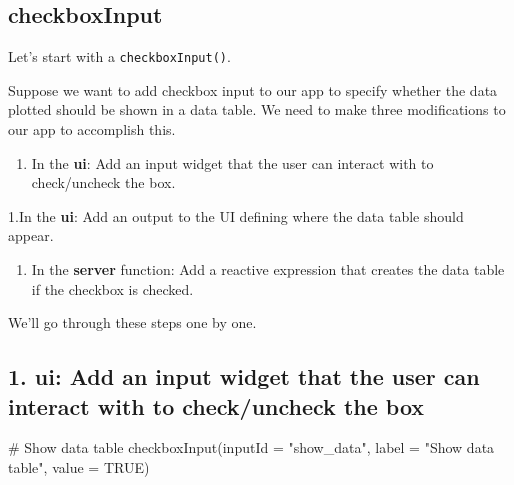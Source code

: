 \documentclass[
  letterpaper,
  DIV=11,
  numbers=noendperiod]{scrreprt}
\newenvironment{Shaded}{\begin{snugshade}}{\end{snugshade}}
\newcommand{\AttributeTok}[1]{\textcolor[rgb]{0.40,0.46,0.14}{#1}}
\newcommand{\CommentTok}[1]{\textcolor[rgb]{0.37,0.37,0.37}{#1}}
\newcommand{\ConstantTok}[1]{\textcolor[rgb]{0.56,0.35,0.01}{#1}}
\newcommand{\FunctionTok}[1]{\textcolor[rgb]{0.28,0.35,0.67}{#1}}
\newcommand{\NormalTok}[1]{\textcolor[rgb]{0.00,0.46,0.62}{#1}}
\newcommand{\StringTok}[1]{\textcolor[rgb]{0.13,0.47,0.30}{#1}}
\providecommand{\tightlist}{%
  \setlength{\itemsep}{0pt}\setlength{\parskip}{0pt}}
\begin{document}
\hypertarget{checkboxinput}{%
\subsection{checkboxInput}\label{checkboxinput}}

Let's start with a \texttt{checkboxInput()}.

Suppose we want to add checkbox input to our app to specify whether the
data plotted should be shown in a data table. We need to make three
modifications to our app to accomplish this.

\begin{enumerate}
\def\labelenumi{\arabic{enumi}.}
\tightlist
\item
  In the \textbf{ui}: Add an input widget that the user can interact
  with to check/uncheck the box.
\end{enumerate}

1.In the \textbf{ui}: Add an output to the UI defining where the data
table should appear.

\begin{enumerate}
\def\labelenumi{\arabic{enumi}.}
\tightlist
\item
  In the \textbf{server} function: Add a reactive expression that
  creates the data table if the checkbox is checked.
\end{enumerate}

We'll go through these steps one by one.

\hypertarget{ui-add-an-input-widget-that-the-user-can-interact-with-to-checkuncheck-the-box}{%
\subsection{\texorpdfstring{1. \textbf{ui}: Add an input widget that the
user can interact with to check/uncheck the
box}{1. ui: Add an input widget that the user can interact with to check/uncheck the box}}\label{ui-add-an-input-widget-that-the-user-can-interact-with-to-checkuncheck-the-box}}

\begin{Shaded}
\begin{Highlighting}[]
\CommentTok{\# Show data table}
\FunctionTok{checkboxInput}\NormalTok{(}\AttributeTok{inputId =} \StringTok{"show\_data"}\NormalTok{,}
              \AttributeTok{label =} \StringTok{"Show data table"}\NormalTok{, }
              \AttributeTok{value =} \ConstantTok{TRUE}\NormalTok{)}
\end{Highlighting}
\end{Shaded}
\end{document}
